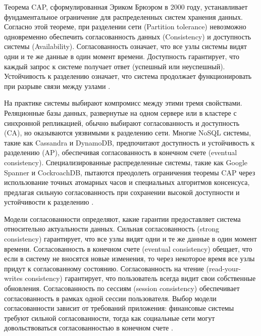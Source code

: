 \documentclass{SibFU-docs}
\begin{document}

Теорема CAP, сформулированная Эриком Брюэром в 2000 году, устанавливает фундаментальное ограничение для распределенных систем хранения данных. Согласно этой теореме, при разделении сети (Partition tolerance) невозможно одновременно обеспечить согласованность данных (Consistency) и доступность системы (Availability). Согласованность означает, что все узлы системы видят одни и те же данные в один момент времени. Доступность гарантирует, что каждый запрос к системе получает ответ (успешный или неуспешный). Устойчивость к разделению означает, что система продолжает функционировать при разрыве связи между узлами \cite{ongaro2014}.

На практике системы выбирают компромисс между этими тремя свойствами. Реляционные базы данных, развернутые на одном сервере или в кластере с синхронной репликацией, обычно выбирают согласованность и доступность (CA), но оказываются уязвимыми к разделению сети. Многие NoSQL системы, такие как Cassandra и DynamoDB, предпочитают доступность и устойчивость к разделению (AP), обеспечивая согласованность в конечном счете (eventual consistency). Специализированные распределенные системы, такие как Google Spanner и CockroachDB, пытаются преодолеть ограничения теоремы CAP через использование точных атомарных часов и специальных алгоритмов консенсуса, предлагая сильную согласованность при сохранении высокой доступности и устойчивости к разделению \cite{corbett2012}.

Модели согласованности определяют, какие гарантии предоставляет система относительно актуальности данных. Сильная согласованность (strong consistency) гарантирует, что все узлы видят одни и те же данные в один момент времени. Согласованность в конечном счете (eventual consistency) обещает, что если в систему не вносятся новые изменения, то через некоторое время все узлы придут к согласованному состоянию. Согласованность на чтение (read-your-writes consistency) гарантирует, что пользователь всегда видит свои собственные обновления. Согласованность по сессиям (session consistency) обеспечивает согласованность в рамках одной сессии пользователя. Выбор модели согласованности зависит от требований приложения: финансовые системы требуют сильной согласованности, тогда как социальные сети могут довольствоваться согласованностью в конечном счете \cite{ongaro2014}.

\end{document}
